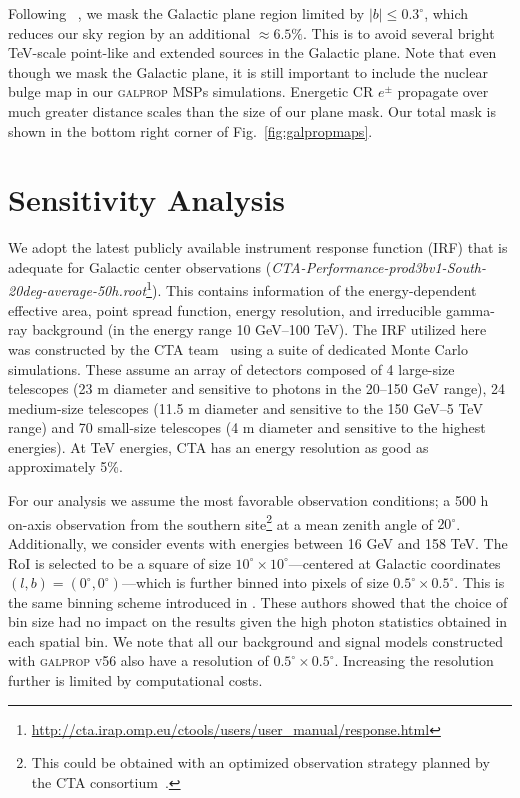 \documentclass[doublespace,nopageskip]{VTthesis} %
\begin{document}
Following ~\cite{2021PhRvD.103b3011R}, we mask the Galactic plane region limited by $\lvert b \rvert \leq 0.3^\circ$, which reduces our sky region by an additional $\approx 6.5\%$. This is to avoid several bright TeV-scale point-like and extended sources in the Galactic plane. Note that even though we mask the Galactic plane, it is still important to include the nuclear bulge map in our \textsc{galprop} MSPs simulations. Energetic CR $e^{\pm}$ propagate over much greater distance scales than the size of our plane mask. Our total mask is shown in the bottom right corner of Fig.~\ref{fig:galpropmaps}.

\section{Sensitivity Analysis}
\label{sec:sensitivity}

We adopt the latest publicly available instrument response function (IRF) that is adequate for Galactic center observations (\textit{CTA-Performance-prod3bv1-South-20deg-average-50h.root}\footnote{\url{http://cta.irap.omp.eu/ctools/users/user_manual/response.html}}). This contains information of the energy-dependent effective area, point spread function, energy resolution, and irreducible gamma-ray background (in the energy range 10 GeV--100 TeV). The IRF utilized here was constructed by the CTA team~\citep{2015ICRC...34..971H} using a suite of dedicated Monte Carlo simulations. These assume an array of detectors composed of 4 large-size telescopes (23 m diameter and sensitive to photons in the 20--150 GeV range),  24 medium-size telescopes (11.5 m diameter and sensitive to the 150 GeV--5 TeV range) and 70 small-size telescopes (4 m diameter and sensitive to the highest energies). At TeV energies, CTA has an energy resolution as good as approximately 5\%.


For our analysis we assume the most favorable observation conditions; a 500 h on-axis observation from the southern site\footnote{This could be obtained with an optimized observation strategy planned by the CTA consortium~\citep{2021JCAP...01..057A}.} at a mean zenith angle of $20^\circ$. Additionally, we consider events with energies between 16 GeV and 158 TeV. The RoI is selected to be a square of size $10^\circ \times 10^\circ$---centered at Galactic coordinates $(l,b)=(0^\circ, 0^\circ)$---which is further binned into pixels of size $0.5^\circ \times 0.5^\circ$. This is the same binning scheme introduced in \cite{2021PhRvD.103b3011R}. These authors showed that the choice of bin size had no impact on the results given the high photon statistics obtained in each spatial bin. We note that all our background and signal models constructed with \textsc{galprop v56} also have a resolution of $0.5^\circ \times 0.5^\circ$. Increasing the resolution further is limited by computational costs.  
\end{document}
